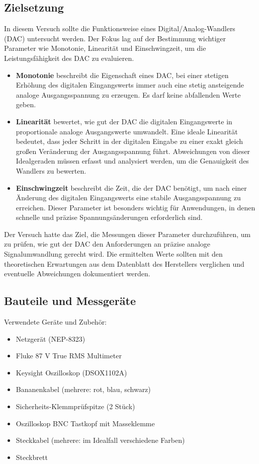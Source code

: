 \documentclass[a4paper,12pt]{article}
\begin{document}
\subsection{Zielsetzung}
In diesem Versuch sollte die Funktionsweise eines Digital/Analog-Wandlers (DAC) untersucht werden. Der Fokus lag auf der Bestimmung wichtiger Parameter wie Monotonie, Linearität und Einschwingzeit, um die Leistungsfähigkeit des DAC zu evaluieren.
\begin{itemize}
    \item \textbf{Monotonie} beschreibt die Eigenschaft eines DAC, bei einer stetigen Erhöhung des digitalen Eingangswerts immer auch eine stetig ansteigende analoge Ausgangsspannung zu erzeugen. Es darf keine abfallenden Werte geben.

    \item \textbf{Linearität} bewertet, wie gut der DAC die digitalen Eingangswerte in proportionale analoge Ausgangswerte umwandelt. Eine ideale Linearität bedeutet, dass jeder Schritt in der digitalen Eingabe zu einer exakt gleich großen Veränderung der Ausgangsspannung führt. Abweichungen von dieser Idealgeraden müssen erfasst und analysiert werden, um die Genauigkeit des Wandlers zu bewerten.

    \item \textbf{Einschwingzeit} beschreibt die Zeit, die der DAC benötigt, um nach einer Änderung des digitalen Eingangswerts eine stabile Ausgangsspannung zu erreichen. Dieser Parameter ist besonders wichtig für Anwendungen, in denen schnelle und präzise Spannungsänderungen erforderlich sind.
\end{itemize}

\noindent Der Versuch hatte das Ziel, die Messungen dieser Parameter durchzuführen, um zu prüfen, wie gut der DAC den Anforderungen an präzise analoge Signalumwandlung gerecht wird. Die ermittelten Werte sollten mit den theoretischen Erwartungen aus dem Datenblatt des Herstellers verglichen und eventuelle Abweichungen dokumentiert werden.

\subsection{Bauteile und Messgeräte}
Verwendete Geräte und Zubehör:
\begin{itemize}
\item Netzgerät (NEP-8323)
\item Fluke 87 V True RMS Multimeter
\item Keysight Oszilloskop (DSOX1102A)
\item Bananenkabel (mehrere: rot, blau, schwarz)
\item Sicherheits-Klemmprüfspitze (2 Stück)
\item Oszilloskop BNC Tastkopf mit Masseklemme
\item Steckkabel (mehrere: im Idealfall verschiedene Farben)
\item Steckbrett\\
\end{itemize}
\end{document}
